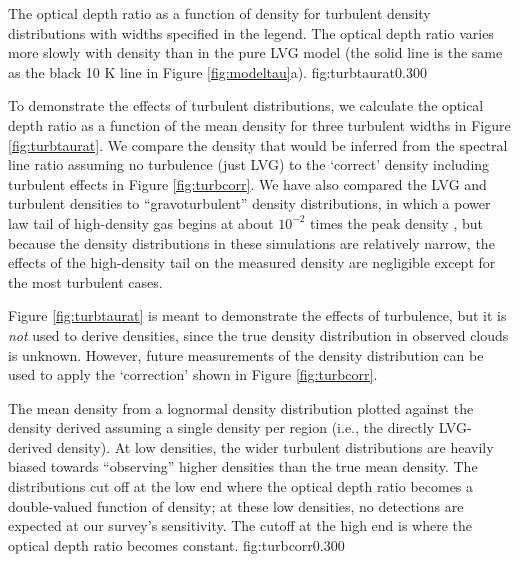 {
The optical depth ratio as a function of density for turbulent density
distributions with widths specified in the legend.  The optical depth ratio
varies more slowly with density than in the pure LVG model (the solid line is
the same as the black 10 K line in Figure \ref{fig:modeltau}a).}
{fig:turbtaurat}{0.30}{0}

To demonstrate the effects of turbulent distributions, we calculate the optical
depth ratio as a function of the mean density for three turbulent widths in
Figure \ref{fig:turbtaurat}.  We compare the density that would be inferred
from the spectral line ratio assuming no turbulence (just LVG) to the `correct'
density including turbulent effects in Figure \ref{fig:turbcorr}.  We have also
compared the LVG and turbulent densities to ``gravoturbulent'' density
distributions, in which a power law tail of high-density gas begins at about
$10^{-2}$ times the peak density \citep[e.g., ][]{Klessen2000,KimCho2011}, but
because the density distributions in these simulations are relatively narrow,
the effects of the high-density tail on the measured density are negligible
except for the most turbulent cases.

Figure \ref{fig:turbtaurat} is meant to demonstrate the effects of turbulence,
but it is \emph{not} used to derive densities, since the true density
distribution in observed clouds is unknown.  However, future measurements of
the density distribution can be used to apply the `correction' shown in Figure
\ref{fig:turbcorr}.


{ The mean density from a lognormal density distribution plotted against the
density derived assuming a single density per region (i.e., the directly
LVG-derived density).   At low densities, the wider turbulent
distributions  are heavily biased towards ``observing'' higher densities than
the true mean density.  The distributions cut off at the low end where the
optical depth ratio becomes a double-valued function of density; at these low
densities, no detections are expected at our survey's sensitivity.  The cutoff
at the high end is where the optical depth ratio becomes constant.  
}
{fig:turbcorr}{0.30}{0}

